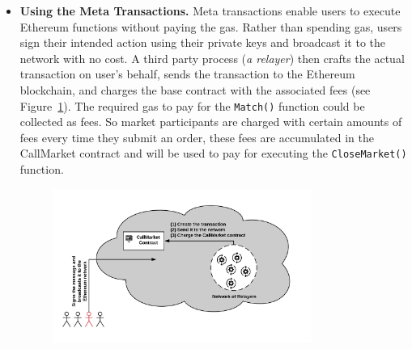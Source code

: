 \begin{itemize}
\begin{itemize}
\item \textbf {Using the Meta Transactions.} Meta transactions enable users to execute Ethereum functions without paying the gas. Rather than spending gas, users sign their intended action using their private keys and broadcast it to the network with no cost. A third party process (\textit{a relayer}) then crafts the actual transaction on user's behalf, sends the transaction to the Ethereum blockchain, and charges the base contract with the associated fees (see Figure~\ref{fig:meta_tx}). The required gas to pay for the \texttt{Match()} function could be collected as fees. So market participants are charged with certain amounts of fees every time they submit an order, these fees are accumulated in the CallMarket contract and will be used to pay for executing the \texttt{CloseMarket()} function.

% 


\begin{figure}[htb!p]
\centering
\includegraphics[width=0.8\textwidth]{fig/meta_tx.png}
\caption{\footnotesize{}  \label{fig:meta_tx}}
\end{figure}




\end{itemize}
\end{itemize}
